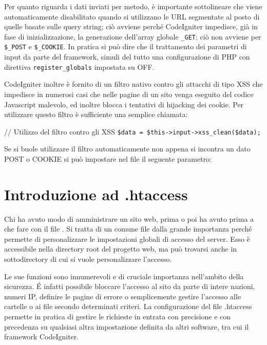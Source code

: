 Per quanto riguarda i dati inviati per metodo, è importante sottolineare che  viene automaticamente disabilitato quando si utilizzano le \ac{URL} segmentate al posto di quelle basate sulle query string; ciò avviene perché CodeIgniter impedisce, già in fase di inizializzazione, la generazione dell'array globale \verb|_GET|; ciò non avviene per \verb|$_POST| e \verb|$_COOKIE|. In pratica si può dire che il trattamento dei parametri di input da parte del framework, simuli del tutto una configurazione di \ac{PHP} con direttiva \verb|register_globals| impostata su OFF.

CodeIgniter inoltre è fornito di un filtro nativo contro gli attacchi di tipo \ac{XSS} che impedisce in numerosi casi che nelle pagine di un sito venga eseguito del codice Javascript malevolo, ed inoltre blocca i tentativi di hijacking dei cookie. Per utilizzare questo filtro è sufficiente una semplice chiamata:

\begin{code}
// Utilizzo del filtro contro gli XSS
\verb|$data = $this->input->xss_clean($data);|
\end{code}

Se si buole utilizzare il filtro automaticamente non appena si incontra un dato POST o COOKIE si può impostare nel file  il seguente parametro:


\section*{Introduzione ad .htaccess}
Chi ha avuto modo di amministrare un sito web, prima o poi ha avuto prima a che fare con il file . Si tratta di un comune file dalla grande importanza perché permette di personalizzare le impostazioni globali di accesso del server. Esso è accessibile nella directory root del progetto web, ma può trovarsi anche in sottodirectory di cui si vuole personalizzare l'accesso.

Le sue funzioni sono innumerevoli e di cruciale importanza nell'ambito della sicurezza. \'E infatti possibile bloccare l'accesso al sito da parte di intere nazioni, numeri IP, definire le pagine di errore o semplicemente gestire l'accesso alle cartelle o ai file secondo determinati criteri. La configurazione del file .htaccess permette in pratica di gestire le richieste in entrata con precisione e con precedenza su qualsiasi altra impostazione definita da altri software, tra cui il framework CodeIgniter.

